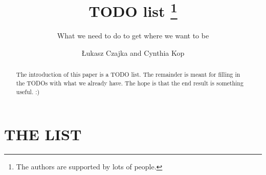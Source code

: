 \documentclass[runningheads,a4paper]{llncs}
\begin{document}
\mainmatter

\title{TODO list
  \thanks{The authors are supported by lots of people.}}
\subtitle{What we need to do to get where we want to be}

\author{{\L}ukasz Czajka and Cynthia Kop}

\maketitle

\begin{abstract}
The introduction of this paper is a TODO list.
The remainder is meant for filling in the TODOs with what we already have.
The hope is that the end result is something useful. :)
\end{abstract}

\section*{THE LIST}

\renewcommand{\theenumii}{\arabic{enumi}.\arabic{enumii}}
\end{document}
